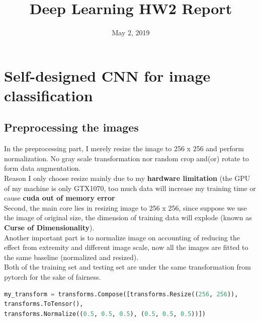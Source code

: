 \documentclass[11pt, a4paper]{article} %
\title{Deep Learning HW2 Report} %
\begin{document}


\date{May 2, 2019}

\maketitle{} %

\setcounter{page}{1} %

\section{Self-designed CNN for image classification} %
\subsection{Preprocessing the images} %
In the preprocessing part, I merely resize the image to 256 x 256 and perform normalization. No gray scale transformation nor random crop and(or) rotate to form data augmentation.
\\ Reason I only choose resize mainly due to my \textbf{hardware limitation} (the GPU of my machine is only GTX1070, too much data will increase my training time or cause \textbf{cuda out of memory error}
\\ Second, the main core lies in resizing image to 256 x 256, since suppose we use the image of original size, the dimension of training data will explode (known as \textbf{Curse of Dimensionality}). 
\\ Another important part is to normalize image on accounting of reducing the effect from extremity and different image scale, now all the images are fitted to the same baseline (normalized and resized).
\\ Both of the training set and testing set are under the same transformation from pytorch for the sake of fairness.
\begin{lstlisting}[language = python]
my_transform = transforms.Compose([transforms.Resize((256, 256)), 
transforms.ToTensor(), 
transforms.Normalize((0.5, 0.5, 0.5), (0.5, 0.5, 0.5))]) 
\end{lstlisting}
\end{document}
